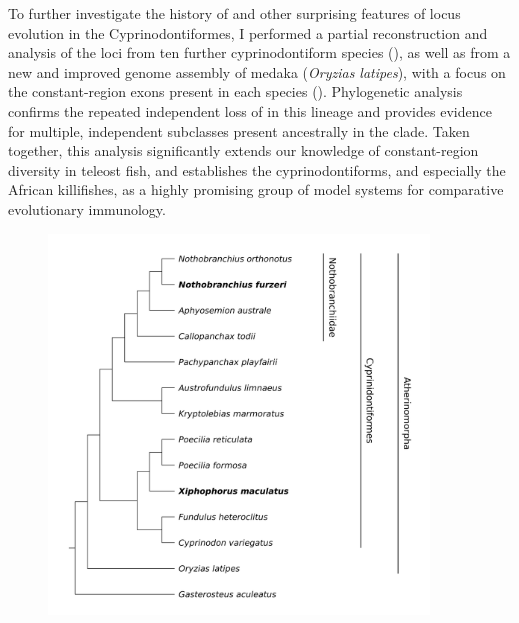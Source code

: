 To further investigate the history of  and other surprising features of \igh{} locus evolution in the Cyprinodontiformes, I performed a partial reconstruction and analysis of the \igh{} loci from ten further cyprinodontiform species (), as well as from a new and improved genome assembly of medaka (\textit{Oryzias latipes}), with a focus on the constant-region exons present in each species (). Phylogenetic analysis confirms the repeated independent loss of  in this lineage and provides evidence for multiple, independent  subclasses present ancestrally in the clade. Taken together, this analysis significantly extends our knowledge of constant-region diversity in teleost fish, and establishes the cyprinodontiforms, and especially the African killifishes, as a highly promising group of model systems for comparative evolutionary immunology.

\begin{figure}
	\centering
	\includegraphics[width=0.9\textwidth]{_Figures/png/species-tree-large-taxa}
	\label{fig:species-tree-large-taxa}
\end{figure}

